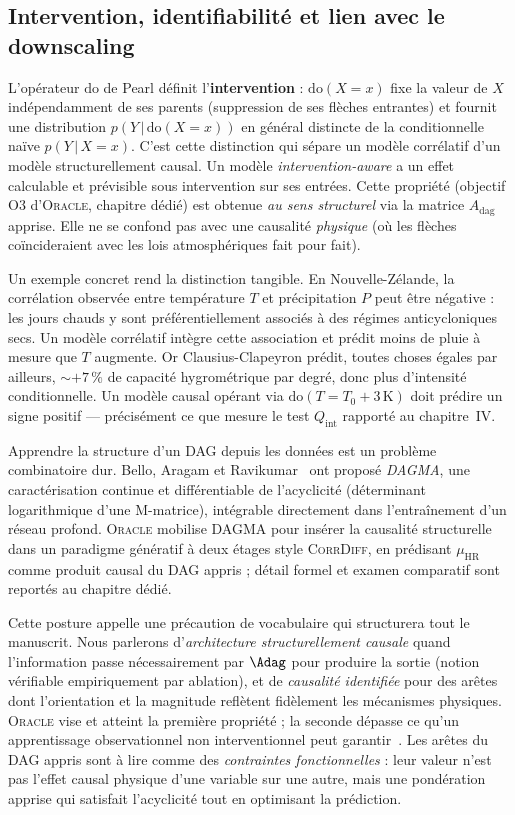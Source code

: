 \documentclass[14pt,a4paper,openany]{extreport}
\newcommand{\Oracle}{\textsc{Oracle}}
\newcommand{\CorrDiff}{\textsc{CorrDiff}}
\newcommand{\HR}{\ensuremath{\text{HR}}}
\newcommand{\muHR}{\ensuremath{\mu_{\HR}}}
\begin{document}
\subsection{Intervention, identifiabilité et lien avec le downscaling}
\label{ssec:intervention}

L'opérateur $\mathrm{do}$ de Pearl définit l'\textbf{intervention} : $\mathrm{do}(X = x)$ fixe la valeur de $X$ indépendamment de ses parents (suppression de ses flèches entrantes) et fournit une distribution $p(Y\,|\,\mathrm{do}(X = x))$ en général distincte de la conditionnelle naïve $p(Y\,|\,X = x)$. C'est cette distinction qui sépare un modèle corrélatif d'un modèle structurellement causal. Un modèle \emph{intervention-aware} a un effet calculable et prévisible sous intervention sur ses entrées. Cette propriété (objectif O3 d'\Oracle{}, chapitre dédié) est obtenue \emph{au sens structurel} via la matrice $A_{\mathrm{dag}}$ apprise. Elle ne se confond pas avec une causalité \emph{physique} (où les flèches coïncideraient avec les lois atmosphériques fait pour fait).

Un exemple concret rend la distinction tangible. En Nouvelle-Zélande, la corrélation observée entre température $T$ et précipitation $P$ peut être négative : les jours chauds y sont préférentiellement associés à des régimes anticycloniques secs. Un modèle corrélatif intègre cette association et prédit moins de pluie à mesure que $T$ augmente. Or Clausius-Clapeyron prédit, toutes choses égales par ailleurs, $\sim$$+7\,\%$ de capacité hygrométrique par degré, donc plus d'intensité conditionnelle. Un modèle causal opérant via $\mathrm{do}(T = T_0+3\,\mathrm{K})$ doit prédire un signe positif --- précisément ce que mesure le test $Q_{\mathrm{int}}$ rapporté au chapitre~IV.

\label{ssec:learned-dag}
Apprendre la structure d'un DAG depuis les données est un problème combinatoire dur. Bello, Aragam et Ravikumar~\cite{bello_dagma_2022} ont proposé \emph{DAGMA}, une caractérisation continue et différentiable de l'acyclicité (déterminant logarithmique d'une M-matrice), intégrable directement dans l'entraînement d'un réseau profond. \Oracle{} mobilise DAGMA pour insérer la causalité structurelle dans un paradigme génératif à deux étages style \CorrDiff{}, en prédisant $\muHR$ comme produit causal du DAG appris ; détail formel et examen comparatif sont reportés au chapitre dédié.

Cette posture appelle une précaution de vocabulaire qui structurera tout le manuscrit. Nous parlerons d'\emph{architecture structurellement causale} quand l'information passe nécessairement par $\Adag$ pour produire la sortie (notion vérifiable empiriquement par ablation), et de \emph{causalité identifiée} pour des arêtes dont l'orientation et la magnitude reflètent fidèlement les mécanismes physiques. \Oracle{} vise et atteint la première propriété ; la seconde dépasse ce qu'un apprentissage observationnel non interventionnel peut garantir~\cite{pearl_causality_2009,spirtes_2000}. Les arêtes du DAG appris sont à lire comme des \emph{contraintes fonctionnelles} : leur valeur n'est pas l'effet causal physique d'une variable sur une autre, mais une pondération apprise qui satisfait l'acyclicité tout en optimisant la prédiction.
\end{document}
